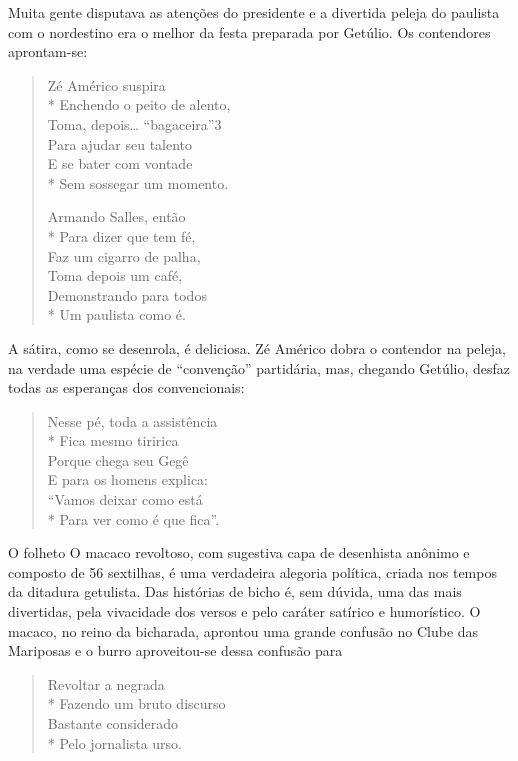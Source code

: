 Muita gente disputava as atenções do presidente e a divertida peleja
do paulista com o nordestino era o melhor da festa preparada por
Getúlio. Os contendores aprontam-se:

\begin{verse}
Zé Américo suspira\\*
Enchendo o peito de alento,\\
Toma, depois\ldots{} “bagaceira”3 \\
Para ajudar seu talento\\
E se bater com vontade \\*
Sem sossegar um momento.

Armando Salles, então\\*
Para dizer que tem fé,\\
Faz um cigarro de palha,\\
Toma depois um café,\\
Demonstrando para todos\\*
Um paulista como é.
\end{verse}

A sátira, como se desenrola, é deliciosa. Zé Américo dobra o contendor
na peleja, na verdade uma espécie de “convenção” partidária, mas,
chegando Getúlio, desfaz todas as esperanças dos convencionais:

\begin{verse}
Nesse pé, toda a assistência\\*
Fica mesmo tiririca\\
Porque chega seu Gegê\\
E para os homens explica:\\
“Vamos deixar como está\\*
Para ver como é que fica”.
\end{verse}

O folheto O macaco revoltoso, com sugestiva capa de desenhista anônimo
e composto de 56 sextilhas, é uma verdadeira alegoria política,
criada nos tempos da ditadura getulista. Das histórias de bicho é,
sem dúvida, uma das mais divertidas, pela vivacidade dos versos e
pelo caráter satírico e humorístico. O macaco, no reino da bicharada,
aprontou uma grande confusão no Clube das Mariposas e o burro
aproveitou-se dessa confusão para

\begin{verse}
Revoltar a negrada\\*
Fazendo um bruto discurso\\
Bastante considerado\\*
Pelo jornalista urso.
\end{verse}

